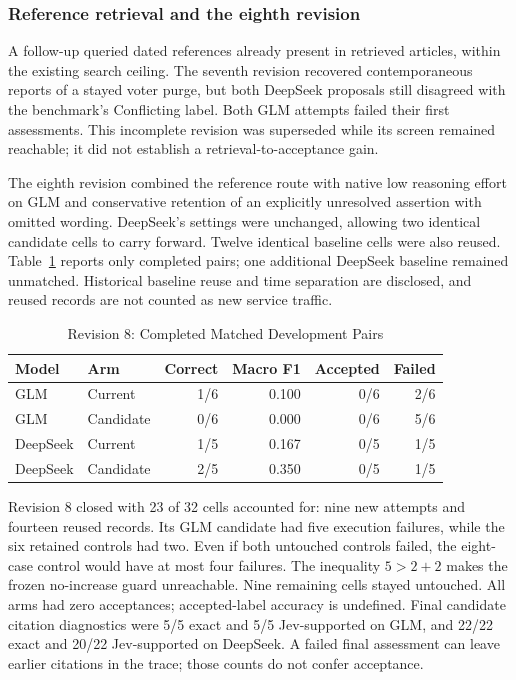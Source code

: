 \documentclass[conference]{IEEEtran}
\begin{document}
\subsubsection{Reference retrieval and the eighth revision}
A follow-up queried dated references already present in retrieved articles, within the existing search ceiling. The seventh revision recovered contemporaneous reports of a stayed voter purge, but both DeepSeek proposals still disagreed with the benchmark's Conflicting label. Both GLM attempts failed their first assessments. This incomplete revision was superseded while its screen remained reachable; it did not establish a retrieval-to-acceptance gain.

The eighth revision combined the reference route with native low reasoning effort on GLM and conservative retention of an explicitly unresolved assertion with omitted wording. DeepSeek's settings were unchanged, allowing two identical candidate cells to carry forward. Twelve identical baseline cells were also reused. Table~\ref{tab:flash-v8} reports only completed pairs; one additional DeepSeek baseline remained unmatched. Historical baseline reuse and time separation are disclosed, and reused records are not counted as new service traffic.

\begin{table}[t]
\caption{Revision 8: Completed Matched Development Pairs}
\label{tab:flash-v8}
\centering
\footnotesize
\begin{tabular}{@{}llrrrr@{}}
\toprule
Model & Arm & Correct & Macro F1 & Accepted & Failed\\
\midrule
GLM & Current & 1/6 & 0.100 & 0/6 & 2/6\\
GLM & Candidate & 0/6 & 0.000 & 0/6 & 5/6\\
DeepSeek & Current & 1/5 & 0.167 & 0/5 & 1/5\\
DeepSeek & Candidate & 2/5 & 0.350 & 0/5 & 1/5\\
\bottomrule
\end{tabular}
\end{table}

Revision 8 closed with 23 of 32 cells accounted for: nine new attempts and fourteen reused records. Its GLM candidate had five execution failures, while the six retained controls had two. Even if both untouched controls failed, the eight-case control would have at most four failures. The inequality $5>2+2$ makes the frozen no-increase guard unreachable. Nine remaining cells stayed untouched. All arms had zero acceptances; accepted-label accuracy is undefined. Final candidate citation diagnostics were 5/5 exact and 5/5 Jev-supported on GLM, and 22/22 exact and 20/22 Jev-supported on DeepSeek. A failed final assessment can leave earlier citations in the trace; those counts do not confer acceptance.
\end{document}
